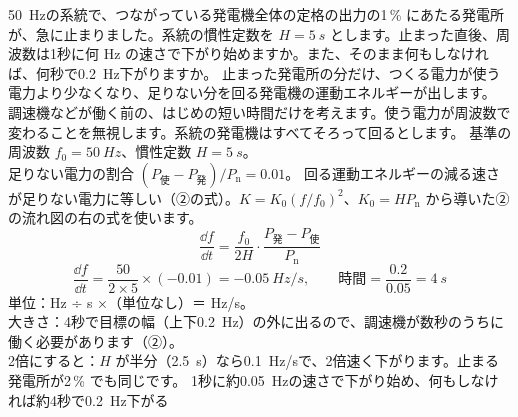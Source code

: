 \begin{kotoba}\small
{}
\end{kotoba}


\begin{phreidai}[発電所が止まった直後の周波数]\label{ph:電-16:ex1}
\qty{50}{Hz}の系統で、つながっている発電機全体の定格の出力の1\,\% にあたる発電所が、急に止まりました。系統の慣性定数を $H=\qty{5}{s}$ とします。止まった直後、周波数は1秒に何 Hz の速さで下がり始めますか。また、そのまま何もしなければ、何秒で\qty{0.2}{Hz}下がりますか。
\phbamen
止まった発電所の分だけ、つくる電力が使う電力より少なくなり、足りない分を回る発電機の運動エネルギーが出します。
\phmushi
調速機などが働く前の、はじめの短い時間だけを考えます。使う電力が周波数で変わることを無視します。系統の発電機はすべてそろって回るとします。
\phzu
基準の周波数 $f_0=\qty{50}{Hz}$、慣性定数 $H=\qty{5}{s}$。\\
足りない電力の割合 $(P_{\text{使}}-P_{\text{発}})/P_{\mathrm n}=0.01$。
\phriyu
回る運動エネルギーの減る速さが足りない電力に等しい（②の式）。$K=K_0(f/f_0)^2$、$K_0=HP_{\mathrm n}$ から導いた②の流れ図の右の式を使います。
\phtateru
\[\frac{\dd f}{\dd t}=\frac{f_0}{2H}\cdot\frac{P_{\text{発}}-P_{\text{使}}}{P_{\mathrm n}}\]
\phtoku
\[\frac{\dd f}{\dd t}=\frac{50}{2\times5}\times(-0.01)=-\qty{0.05}{Hz/s},\qquad \text{時間}=\frac{0.2}{0.05}=\qty{4}{s}\]
\phtashikame
単位：Hz ÷ s ×（単位なし）＝ Hz/s。\\
大きさ：4秒で目標の幅（上下\qty{0.2}{Hz}）の外に出るので、調速機が数秒のうちに働く必要があります（②）。\\
2倍にすると：$H$ が半分（\qty{2.5}{s}）なら\qty{0.1}{Hz/s}で、2倍速く下がります。止まる発電所が2\,\% でも同じです。
\kotae 1秒に約\qty{0.05}{Hz}の速さで下がり始め、何もしなければ約4秒で\qty{0.2}{Hz}下がる
\end{phreidai}

